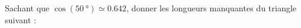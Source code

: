 
\begin{exercice}\label{exo2smath-0147}

    Sachant que \( \cos(\SI{50}{\degree})\simeq 0.642\), donner les longueurs manquantes du triangle suivant :
\begin{center}
   
\end{center}

\end{exercice}
